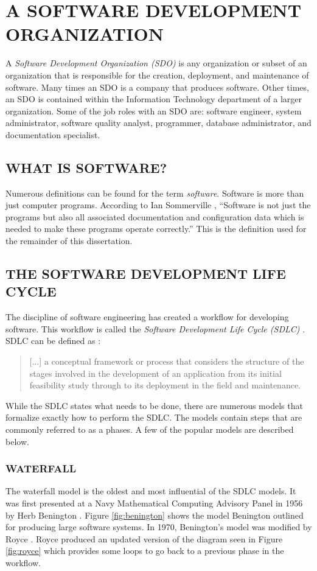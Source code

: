 \documentclass[SDSUThesis.tex]{subfiles}
\begin{document}
\section{A SOFTWARE DEVELOPMENT ORGANIZATION}
A \textit{Software Development Organization (SDO)} is any organization or subset of an organization that is responsible
for the creation, deployment, and maintenance of software.  Many times an SDO
is a company that produces software.  Other times, an SDO is contained
within the Information Technology department of a larger organization. Some of the job roles
with an SDO are: software engineer, system administrator, software quality analyst,
programmer, database administrator, and documentation specialist.


\subsection{WHAT IS SOFTWARE?}
Numerous definitions can be found for the term \textit{software}.
Software is more than just computer programs. According to Ian Sommerville \cite{Sommerville2001}, 
``Software is not just the programs but also all associated documentation and configuration data which is needed to make these programs operate correctly.''
This is the definition used for the remainder of this dissertation.


\subsection{THE SOFTWARE DEVELOPMENT LIFE CYCLE}
    The discipline of software engineering has created a workflow for developing
    software.  
    This workflow is called the \textit{Software Development Life Cycle (SDLC)}
    .
    SDLC can be defined as \cite{Ruparelia2010}:
    \begin{quote}
     [...] a conceptual framework or process that considers the structure of the stages
     involved in the development of an application from its initial feasibility study
     through to its deployment in the field and maintenance.
    \end{quote}
    While the SDLC states what needs to be done, there are numerous models 
    that formalize exactly how to perform the SDLC.  The models contain
    steps that are commonly referred to as a phases. A few of the popular
    models are described below.
    
    
    \subsubsection{WATERFALL}
        The waterfall model is the oldest and most influential of the SDLC models. 
        It was first presented at a Navy Mathematical Computing Advisory Panel in 1956
        by Herb Benington \cite{Benington1987}. Figure \ref{fig:benington} shows
        the model Benington outlined for producing large software systems.  
        In 1970, Benington's model was modified by Royce \cite{Royce1987}.  Royce
        produced an updated version of the diagram seen in Figure \ref{fig:royce}
        which provides some loops to go back to a previous phase in the workflow.
    
\end{document}
